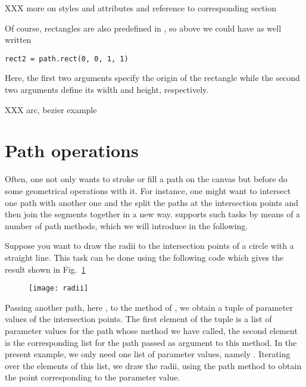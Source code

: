 XXX more on styles and attributes and reference to corresponding section

Of course, rectangles are also predefined in \PyX{}, so above we could
have as well written
\begin{verbatim}
rect2 = path.rect(0, 0, 1, 1)
\end{verbatim}
Here, the first two arguments specify the origin of the rectangle
while the second two arguments define its width and height,
respectively.

XXX arc, bezier example

\section{Path operations}

Often, one not only wants to stroke or fill a path on the canvas
but before do some geometrical operations with it. For instance, one
might want to intersect one path with another one and the split the
paths at the intersection points and then join the segments together
in a new way. \PyX{} supports such tasks by means of a number
of path methods, which we will introduce in the following.

Suppose you want to draw the radii to the intersection points of a
circle with a straight line. This task can be done using the following
code which gives the result shown in Fig.~\ref{fig:radii}

\begin{figure}
\centerline{\texttt{[image: radii]}}
\label{fig:radii}
\end{figure}
Passing another path, here , to the  method
of , we obtain a tuple of parameter values of the
intersection points. The first element of the tuple is a list of
parameter values for the path whose  method we have
called, the second element is the corresponding list for the path
passed as argument to this method. In the present example, we only
need one list of parameter values, namely .
Iterating over the elements of this list, we draw the radii, using the
 path method to obtain the point corresponding to the
parameter value.

